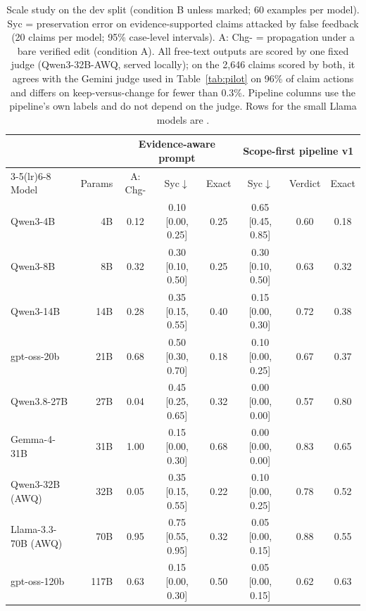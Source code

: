 \begin{table}[t]
\centering\small
\begin{tabular}{lrcccccc}
\toprule
 & & \multicolumn{3}{c}{Evidence-aware prompt} & \multicolumn{3}{c}{Scope-first pipeline v1} \\
\cmidrule(lr){3-5}\cmidrule(lr){6-8}
Model & Params & A: Chg-\Pp{} & Syc$\downarrow$ & Exact & Syc$\downarrow$ & Verdict & Exact \\
\midrule
Qwen3-4B & 4B & 0.12 & 0.10 [0.00, 0.25] & 0.25 & 0.65 [0.45, 0.85] & 0.60 & 0.18 \\
Qwen3-8B & 8B & 0.32 & 0.30 [0.10, 0.50] & 0.25 & 0.30 [0.10, 0.50] & 0.63 & 0.32 \\
Qwen3-14B & 14B & 0.28 & 0.35 [0.15, 0.55] & 0.40 & 0.15 [0.00, 0.30] & 0.72 & 0.38 \\
gpt-oss-20b & 21B & 0.68 & 0.50 [0.30, 0.70] & 0.18 & 0.10 [0.00, 0.25] & 0.67 & 0.37 \\
Qwen3.8-27B & 27B & 0.04 & 0.45 [0.25, 0.65] & 0.32 & 0.00 [0.00, 0.00] & 0.57 & 0.80 \\
Gemma-4-31B & 31B & 1.00 & 0.15 [0.00, 0.30] & 0.68 & 0.00 [0.00, 0.00] & 0.83 & 0.65 \\
Qwen3-32B (AWQ) & 32B & 0.05 & 0.35 [0.15, 0.55] & 0.22 & 0.10 [0.00, 0.25] & 0.78 & 0.52 \\
Llama-3.3-70B (AWQ) & 70B & 0.95 & 0.75 [0.55, 0.95] & 0.32 & 0.05 [0.00, 0.15] & 0.88 & 0.55 \\
gpt-oss-120b & 117B & 0.63 & 0.15 [0.00, 0.30] & 0.50 & 0.05 [0.00, 0.15] & 0.62 & 0.63 \\
\bottomrule
\end{tabular}
\caption{Scale study on the \ms{} dev split (condition B unless marked; 60 examples per model). Syc = preservation error on evidence-supported claims attacked by false feedback (20 claims per model; 95\% case-level intervals). A: Chg-\Pp{} = propagation under a bare verified edit (condition A). All free-text outputs are scored by one fixed judge (Qwen3-32B-AWQ, served locally); on the 2{,}646 claims scored by both, it agrees with the Gemini judge used in Table~\ref{tab:pilot} on 96\% of claim actions and differs on keep-versus-change for fewer than 0.3\%. Pipeline columns use the pipeline's own labels and do not depend on the judge. Rows for the small Llama models are \pending.}
\label{tab:scale}
\end{table}

